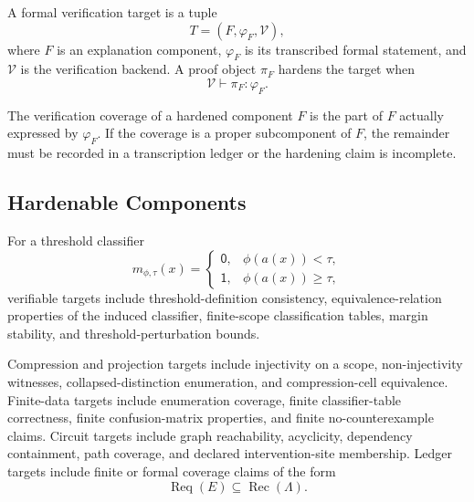 \begin{definition}
\label{def:philosophy-formal-verification-target}
A formal verification target is a tuple
$$
T=(F,\varphi_F,\mathcal V),
$$
where $F$ is an explanation component, $\varphi_F$ is its transcribed
formal statement, and $\mathcal V$ is the verification backend. A proof
object $\pi_F$ hardens the target when
$$
\mathcal V\vdash \pi_F:\varphi_F.
$$
\end{definition}

\begin{definition}
\label{def:philosophy-verification-coverage}
The verification coverage of a hardened component $F$ is the part of
$F$ actually expressed by $\varphi_F$. If the coverage is a proper
subcomponent of $F$, the remainder must be recorded in a transcription
ledger or the hardening claim is incomplete.
\end{definition}

\subsection{Hardenable Components}
\label{subsec:philosophy-formal-verification-hardenable-components}

\begin{definition}
\label{def:philosophy-threshold-classifier-verification-targets}
For a threshold classifier
$$
m_{\phi,\tau}(x)=
\begin{cases}
\mathsf{0},&\phi(a(x))<\tau,\\
\mathsf{1},&\phi(a(x))\geq\tau,
\end{cases}
$$
verifiable targets include threshold-definition consistency,
equivalence-relation properties of the induced classifier, finite-scope
classification tables, margin stability, and threshold-perturbation
bounds.
\end{definition}

\begin{definition}
\label{def:philosophy-common-verification-targets}
Compression and projection targets include injectivity on a scope,
non-injectivity witnesses, collapsed-distinction enumeration, and
compression-cell equivalence. Finite-data targets include enumeration
coverage, finite classifier-table correctness, finite confusion-matrix
properties, and finite no-counterexample claims. Circuit targets include
graph reachability, acyclicity, dependency containment, path coverage,
and declared intervention-site membership. Ledger targets include finite
or formal coverage claims of the form
$$
\operatorname{Req}(E)\subseteq\operatorname{Rec}(\Lambda).
$$
\end{definition}

